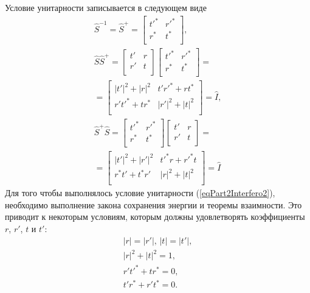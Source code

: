 Условие унитарности записывается в следующем виде
\begin{eqnarray}
\hat{S}^{-1} = 
\hat{S}^{+} =
\begin{bmatrix}
t'^\ast & r'^\ast \\
r^\ast & t^\ast \\
\end{bmatrix}, 
\nonumber \\
\hat{S} \hat{S}^{+} =
\begin{bmatrix}
t' & r \\
r' & t \\
\end{bmatrix}
\begin{bmatrix}
t'^\ast & r'^\ast \\
r^\ast & t^\ast \\
\end{bmatrix} =
\nonumber \\
=
\begin{bmatrix}
\left|t'\right|^2 + \left|r\right|^2 & t' r'^\ast + r t^\ast \\
r' t'^\ast + t r^\ast & \left|r'\right|^2 + \left|t\right|^2 \\
\end{bmatrix} = 
\hat{I},
\nonumber \\
\hat{S}^{+} \hat{S} =
\begin{bmatrix}
t'^\ast & r'^\ast \\
r^\ast & t^\ast \\
\end{bmatrix}
\begin{bmatrix}
t' & r \\
r' & t \\
\end{bmatrix}
 =
\nonumber \\
=
\begin{bmatrix}
\left|t'\right|^2 + \left|r'\right|^2 & t'^\ast r + r'^\ast t \\
r^\ast t' + t^\ast r' & \left|r\right|^2 + \left|t\right|^2 \\
\end{bmatrix} = 
\hat{I}
\label{eqPart2Interfero2}
\end{eqnarray}
Для того чтобы выполнялось условие унитарности
(\ref{eqPart2Interfero2}), необходимо выполнение закона сохранения
энергии и теоремы взаимности. Это приводит к некоторым условиям,
которым должны удовлетворять коэффициенты $r$, $r'$, $t$ и $t'$:
\begin{eqnarray}
\left|r\right| = \left|r'\right|, \, \left|t\right| = \left|t'\right|,
\nonumber \\
\left|r\right|^2 + \left|t\right|^2 = 1, 
\nonumber \\
r' t'^\ast + t r^\ast = 0,
\nonumber \\
t' r^\ast + r' t^\ast = 0.
\label{eqPart2Interfero3}
\end{eqnarray}
